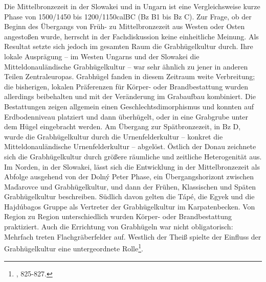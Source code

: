 \documentclass[openany,twoside,twocolumn]{book}
\let\rmarkdownfootnote\footnote%
\def\footnote{\protect\rmarkdownfootnote}
\begin{document}
Die Mittelbronzezeit in der Slowakei und in Ungarn ist eine
Vergleichsweise kurze Phase von 1500/1450 bis 1200/1150calBC (Bz B1 bis
Bz C). Zur Frage, ob der Beginn des Übergangs von Früh- zu
Mittelbronzezeit aus Westen oder Osten angestoßen wurde, herrscht in der
Fachdiskussion keine einheitliche Meinung. Als Resultat setzte sich
jedoch im gesamten Raum die Grabhügelkultur durch. Ihre lokale
Ausprägung -- im Westen Ungarns und der Slowakei die
Mitteldonauländische Grabhügelkultur -- war sehr ähnlich zu jener in
anderen Teilen Zentraleuropas. Grabhügel fanden in diesem Zeitraum weite
Verbreitung; die bisherigen, lokalen Präferenzen für Körper- oder
Brandbestattung wurden allerdings beibehalten und mit der Veränderung im
Grabaufbau kombiniert. Die Bestattungen zeigen allgemein einen
Geschlechtsdimorphismus und konnten auf Erdbodenniveau platziert und
dann überhügelt, oder in eine Grabgrube unter dem Hügel eingebracht
werden. Am Übergang zur Spätbronzezeit, in Bz D, wurde die
Grabhügelkultur durch die Urnenfelderkultur -- konkret die
Mitteldonauländische Urnenfelderkultur -- abgelöst. Östlich der Donau
zeichnete sich die Grabhügelkultur durch größere räumliche und zeitliche
Heterogenität aus. Im Norden, in der Slowakei, lässt sich die
Entwicklung in der Mittelbronzezeit als Abfolge ausgehend von der Dolný
Peter Phase, ein Übergangshorizont zwischen Maďarovce und
Grabhügelkultur, und dann der Frühen, Klassischen und Späten
Grabhügelkultur beschreiben. Südlich davon gelten die Tápé, die Egyek
und die Hajdúbagos Gruppe als Vertreter der Grabhügelkultur im
Karpatenbecken. Von Region zu Region unterschiedlich wurden Körper- oder
Brandbestattung praktiziert. Auch die Errichtung von Grabhügeln war
nicht obligatorisch: Mehrfach treten Flachgräberfelder auf. Westlich der
Theiß spielte der Einfluss der Grabhügelkultur eine untergeordnete
Rolle\footnote{\textcite{markova_slovakia_2013}, 825-827.}.
\end{document}
